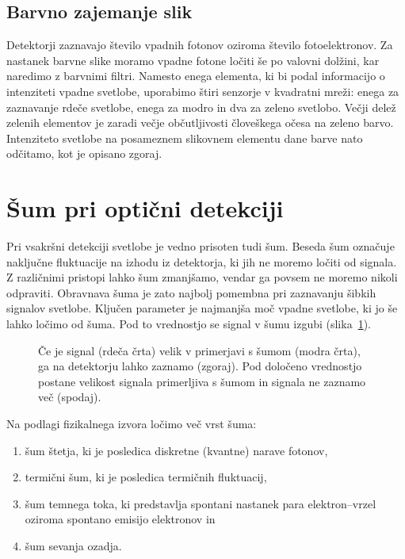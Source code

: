 \subsection*{Barvno zajemanje slik}
Detektorji zaznavajo število vpadnih fotonov oziroma število fotoelektronov.
Za nastanek barvne slike moramo vpadne fotone ločiti še po valovni dolžini, kar naredimo
z barvnimi filtri. Namesto enega elementa, ki bi podal informacijo o intenziteti vpadne 
svetlobe, uporabimo štiri senzorje v kvadratni mreži: enega za zaznavanje rdeče svetlobe,
enega za modro in dva za zeleno svetlobo.
Večji delež zelenih elementov je zaradi večje občutljivosti človeškega očesa na zeleno barvo. 
Intenziteto svetlobe na posameznem slikovnem elementu dane barve nato odčitamo, kot je
opisano zgoraj.
 
\section{Šum pri optični detekciji}
\label{chap:sum}
Pri vsakršni detekciji svetlobe je vedno prisoten tudi šum. Beseda šum označuje naključne 
fluktuacije na izhodu iz detektorja, ki jih ne moremo ločiti od signala. Z različnimi 
pristopi lahko šum zmanjšamo, vendar ga povsem ne moremo nikoli odpraviti. Obravnava 
šuma je zato najbolj pomembna pri zaznavanju šibkih signalov svetlobe. Ključen
parameter je najmanjša moč vpadne svetlobe, ki jo še lahko ločimo od šuma. Pod to vrednostjo 
se signal v šumu izgubi (slika~\ref{11_sum}).
\begin{figure}[h]
\centering
\def\svgwidth{140truemm} 

\caption{Če je signal (rdeča črta) velik v primerjavi s šumom (modra črta), 
ga na detektorju lahko zaznamo (zgoraj). 
Pod določeno vrednostjo postane velikost signala primerljiva s šumom in signala ne zaznamo več
(spodaj).}
\label{11_sum}
\end{figure}

Na podlagi fizikalnega izvora ločimo več vrst šuma:
\begin{enumerate}
\item šum štetja, ki je posledica diskretne (kvantne) narave fotonov,
\item termični šum, ki je posledica termičnih fluktuacij,
\item šum temnega toka, ki predstavlja spontani nastanek para elektron--vrzel oziroma spontano
emisijo elektronov in
\item šum sevanja ozadja.
\end{enumerate}

